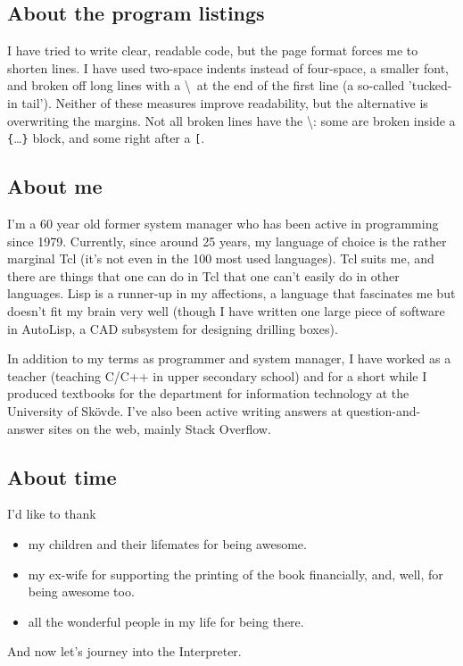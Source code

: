 \documentclass[twoside,9pt]{report}
\begin{document}
\subsection{About the program listings}
\label{about-the-program-listings}

I have tried to write clear, readable code, but the page format forces me to
shorten lines. I have used two-space indents instead of four-space, a smaller
font, and broken off long lines with a \textbackslash\  at the end of the first
line (a so-called 'tucked-in tail'). Neither of these measures improve
readability, but the alternative is overwriting the margins. Not all broken
lines have the \textbackslash: some are broken inside a
\texttt{\{}\ldots\texttt{\}} block, and some right after a \texttt{^^5b}.

\subsection{About me}
\label{about-me}

I'm a 60 year old former system manager who has been active in programming
since 1979. Currently, since around 25 years, my language of choice is the
rather marginal Tcl (it's not even in the 100 most used languages). Tcl suits
me, and there are things that one can do in Tcl that one can't easily do in
other languages. Lisp is a runner-up in my affections, a language that
fascinates me but doesn't fit my brain very well (though I have written one
large piece of software in AutoLisp, a CAD subsystem for designing drilling
boxes).

In addition to my terms as programmer and system manager, I have worked as a
teacher (teaching C/C++ in upper secondary school) and for a short while I
produced textbooks for the department for information technology at
the University of Skövde. I've also been active writing answers at
question-and-answer sites on the web, mainly Stack Overflow.

\subsection{About time}
\label{about-time}

I'd like to thank

\begin{itemize}
\item my children and their lifemates for being awesome.

\item my ex-wife for supporting the printing of the book financially, and, well, for being awesome too.

\item all the wonderful people in my life for being there.
\end{itemize}

And now let's journey into the Interpreter.
\end{document}
